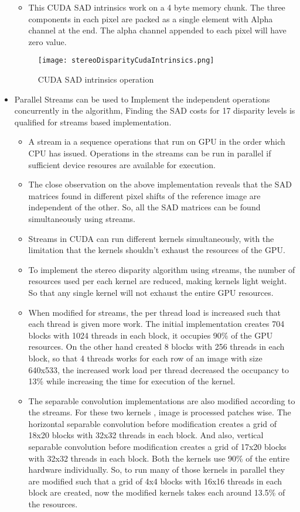 \begin{itemize}
\begin{itemize}
		\item This CUDA SAD intrinsics work on a 4 byte memory chunk. The three components in each pixel are packed as a single element with Alpha channel at the end. The alpha channel appended to each pixel will have zero value.
	\end{itemize}
	\begin{figure}[h!]
		\centering
		\texttt{[image: stereoDisparityCudaIntrinsics.png]}
		\caption{CUDA SAD intrinsics operation}
		\label{fig:CUDA intrinsics}
	\end{figure}
	\item Parallel Streams can be used to Implement the independent operations concurrently in the algorithm, Finding the SAD costs for 17 disparity levels is qualified for streams based implementation.
	\begin{itemize}
		\item A stream ia a sequence operations that run on GPU in the order which CPU has issued. Operations in the streams can be run in parallel if sufficient device resoures are available for execution.
		\item The close observation on the above implementation reveals that the SAD matrices found in different pixel shifts of the reference image are independent of the other. So, all the SAD matrices can be found simultaneously using streams.
		\item Streams in CUDA can run different kernels simultaneously, with the limitation that the kernels shouldn’t exhaust the resources of the GPU.
		\item To implement the stereo disparity algorithm using streams, the number of resources used per each kernel are reduced, making kernels light weight. So that any single kernel will not exhaust the entire GPU resources.
		\item When modified for streams, the per thread load is increased such that each thread is given more work. The initial implementation creates 704 blocks with 1024 threads in each block, it occupies 90\% of the GPU resources. On the other hand created 8 blocks with 256 threads in each block, so that 4 threads works for each row of an image with size 640x533, the increased work load per thread decreased the occupancy to 13\% while increasing the time for execution of the kernel.
		\item The separable convolution implementations are also modified according to the streams. For these two kernels , image is processed patches wise. The horizontal separable convolution before modification creates a grid of 18x20 blocks with 32x32 threads in each block. And also, vertical separable convolution before modification creates a grid of 17x20 blocks with 32x32 threads in each block. Both the kernels use 90\% of the entire hardware individually. So, to run many of those kernels in parallel they are modified such that a grid of 4x4 blocks with 16x16 threads in each block are created, now the modified kernels takes each around 13.5\% of the resources.

\end{itemize}
\end{itemize}
